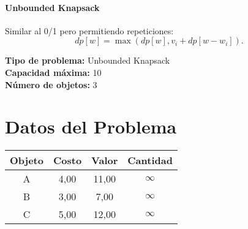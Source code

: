 \documentclass{article}
\begin{document}
\paragraph{Unbounded Knapsack} Similar al 0/1 pero permitiendo repeticiones:
\[
dp[w] = \max ( dp[w], v_i + dp[w - w_i] ).
\]

\thispagestyle{empty}
\newpage
\textbf{Tipo de problema:} Unbounded Knapsack\\
\textbf{Capacidad máxima:} 10\\
\textbf{Número de objetos:} 3\\

\section*{Datos del Problema}
\begin{tabular}{|c|c|c|c|}
\hline
Objeto & Costo & Valor & Cantidad \\
\hline
A & 4,00 & 11,00 & $\infty$ \\
B & 3,00 & 7,00 & $\infty$ \\
C & 5,00 & 12,00 & $\infty$ \\
\hline
\end{tabular}
\end{document}
